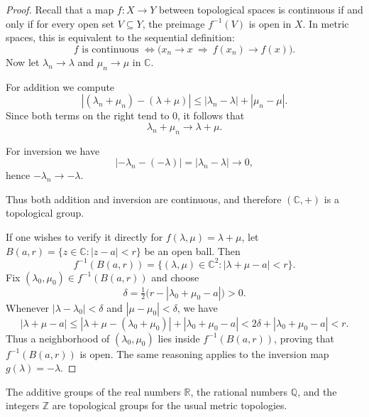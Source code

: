 \begin{proof}
    Recall that a map \( f : X \to Y \) between topological spaces is continuous if and only if for every open set \( V \subseteq Y \), the preimage \( f^{-1}(V) \) is open in \( X \).  In metric spaces, this is equivalent to the sequential definition:
    \[
        f \text{ is continuous } \iff \big(x_n \to x \ \Rightarrow\ f(x_n) \to f(x)\big).
    \]
    Now let \( \lambda_n \to \lambda \) and \( \mu_n \to \mu \) in \( \mathbb{C} \).

    For addition we compute
    \[
        |(\lambda_n+\mu_n)-(\lambda+\mu)|
        \le |\lambda_n-\lambda| + |\mu_n-\mu|.
    \]
    Since both terms on the right tend to \(0\), it follows that
    \[
        \lambda_n+\mu_n \to \lambda+\mu .
    \]

    For inversion we have
    \[
        |-\lambda_n-(-\lambda)| = |\lambda_n-\lambda| \to 0,
    \]
    hence \( -\lambda_n \to -\lambda \).

    Thus both addition and inversion are continuous, and therefore \( (\mathbb{C},+) \) is a topological group.

    If one wishes to verify it directly for \( f(\lambda,\mu) = \lambda + \mu \),
    let \( B(a,r) = \{ z \in \mathbb{C} : |z - a| < r \} \) be an open ball.
    Then
    \[
        f^{-1}(B(a,r)) = \{ (\lambda,\mu) \in \mathbb{C}^2 : |\lambda + \mu - a| < r \}.
    \]
    Fix \( (\lambda_0,\mu_0) \in f^{-1}(B(a,r)) \) and choose
    \[
        \delta = \tfrac{1}{2}\big(r - |\lambda_0 + \mu_0 - a|\big) > 0.
    \]
    Whenever \( |\lambda - \lambda_0| < \delta \) and \( |\mu - \mu_0| < \delta \),
    we have
    \[
        |\lambda + \mu - a|
        \le |\lambda + \mu - (\lambda_0 + \mu_0)| + |\lambda_0 + \mu_0 - a|
        < 2\delta + |\lambda_0 + \mu_0 - a| < r.
    \]
    Thus a neighborhood of \( (\lambda_0,\mu_0) \) lies inside \( f^{-1}(B(a,r)) \),
    proving that \( f^{-1}(B(a,r)) \) is open.
    The same reasoning applies to the inversion map \( g(\lambda) = -\lambda \).

\end{proof}

\begin{example}
    \label{ex:additive-groups-R-Q-Z}

    The additive groups of the real numbers \( \mathbb{R} \), the rational numbers \( \mathbb{Q} \), and the integers \( \mathbb{Z} \) are topological groups for the usual metric topologies.
\end{example}



